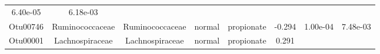 \documentclass[11pt,]{article}
\begin{document}
\begin{longtable}[]{@{}cccccccc@{}}
\begin{minipage}[t]{0.08\columnwidth}
6.40e-05\strut
\end{minipage} & \begin{minipage}[t]{0.08\columnwidth}\centering\strut
6.18e-03\strut
\end{minipage}\tabularnewline
\begin{minipage}[t]{0.08\columnwidth}\centering\strut
Otu00746\strut
\end{minipage} & \begin{minipage}[t]{0.15\columnwidth}\centering\strut
Ruminococcaceae\strut
\end{minipage} & \begin{minipage}[t]{0.15\columnwidth}\centering\strut
Ruminococcaceae\strut
\end{minipage} & \begin{minipage}[t]{0.08\columnwidth}\centering\strut
normal\strut
\end{minipage} & \begin{minipage}[t]{0.09\columnwidth}\centering\strut
propionate\strut
\end{minipage} & \begin{minipage}[t]{0.07\columnwidth}\centering\strut
-0.294\strut
\end{minipage} & \begin{minipage}[t]{0.08\columnwidth}\centering\strut
1.00e-04\strut
\end{minipage} & \begin{minipage}[t]{0.08\columnwidth}\centering\strut
7.48e-03\strut
\end{minipage}\tabularnewline
\begin{minipage}[t]{0.08\columnwidth}\centering\strut
Otu00001\strut
\end{minipage} & \begin{minipage}[t]{0.15\columnwidth}\centering\strut
Lachnospiraceae\strut
\end{minipage} & \begin{minipage}[t]{0.15\columnwidth}\centering\strut
Lachnospiraceae\strut
\end{minipage} & \begin{minipage}[t]{0.08\columnwidth}\centering\strut
normal\strut
\end{minipage} & \begin{minipage}[t]{0.09\columnwidth}\centering\strut
propionate\strut
\end{minipage} & \begin{minipage}[t]{0.07\columnwidth}\centering\strut
0.291\strut
\end{minipage} & \begin{minipage}[t]{0.08\columnwidth}\centering\strut

\end{minipage}
\end{longtable}
\end{document}
